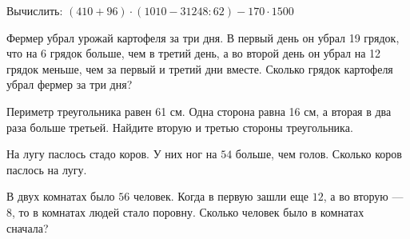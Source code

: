 \begin{homework}[number=1]
	\begin{listofex}
	\item Вычислить: \( (410+96)\cdot(1010-31248:62)-170\cdot1500 \)
	\item Фермер убрал урожай картофеля за три дня. В первый день он убрал 19 грядок, что на 6 грядок больше, чем в третий день, а во второй день он убрал на 12 грядок меньше, чем за первый и третий дни вместе. Сколько грядок картофеля убрал фермер за три дня?
	\item Периметр треугольника равен 61 см. Одна сторона равна 16 см, а вторая в два раза больше третьей. Найдите вторую и третью стороны треугольника.
	\item На лугу паслось стадо коров. У них ног на \( 54 \) больше, чем голов. Сколько коров паслось на лугу.
	\item В двух комнатах было \( 56 \) человек. Когда в первую зашли еще \( 12 \), а во вторую --- \( 8 \), то в комнатах людей стало поровну. Сколько человек было в комнатах сначала?
	\end{listofex}
\end{homework}

